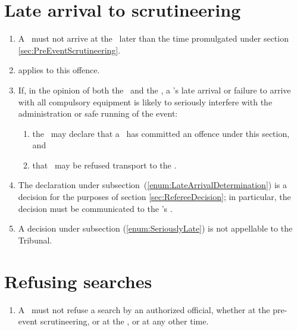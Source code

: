 \documentclass[12pt]{report}
\begin{document}
  \section{Late arrival to scrutineering}
  \begin{enumerate}
    \item A \team\ must not arrive at the \scrutineeringarea\ later than the time promulgated under section \ref{sec:PreEventScrutineering}.

    \item {} applies to this offence.
    \item If, in the opinion of both the \Referee\ and the \RaceDirector, a \team's late arrival or failure to arrive with all compulsory equipment is likely to seriously interfere with the administration or safe running of the event:\label{enum:SeriouslyLate}
         \begin{enumerate}
         \item the \Referee\ may declare that a \team\ has committed an offence under this section, and \label{enum:LateArrivalDetermination}
         \item    that \team\ may be refused transport to the \dropoffpoint.
         \end{enumerate}
    \item The declaration under subsection~\thesection(\ref{enum:LateArrivalDetermination}) is a decision for the purposes of section \ref{sec:RefereeDecision}; in particular, the decision must be communicated to the \team's \Captain.
    \item A decision under subsection \thesection(\ref{enum:SeriouslyLate}) is not appellable to the Tribunal.
  \end{enumerate}
  \section{Refusing searches}
  \begin{enumerate}\item[]
  A \team\ must not refuse a search by an authorized official, whether at the pre-event scrutineering, or at the \Endpoint, or at any other time.

  \end{enumerate}
\end{document}
